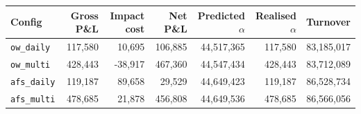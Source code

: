 \begin{tabular}{lrrrrrr}
\toprule
Config & Gross P\&L & Impact cost & Net P\&L & Predicted $\alpha$ & Realised $\alpha$ & Turnover \\
\midrule
\texttt{ow\_daily} & 117,580 & 10,695 & 106,885 & 44,517,365 & 117,580 & 83,185,017 \\
\texttt{ow\_multi} & 428,443 & -38,917 & 467,360 & 44,547,434 & 428,443 & 83,712,089 \\
\texttt{afs\_daily} & 119,187 & 89,658 & 29,529 & 44,649,423 & 119,187 & 86,528,734 \\
\texttt{afs\_multi} & 478,685 & 21,878 & 456,808 & 44,649,536 & 478,685 & 86,566,056 \\
\bottomrule
\end{tabular}